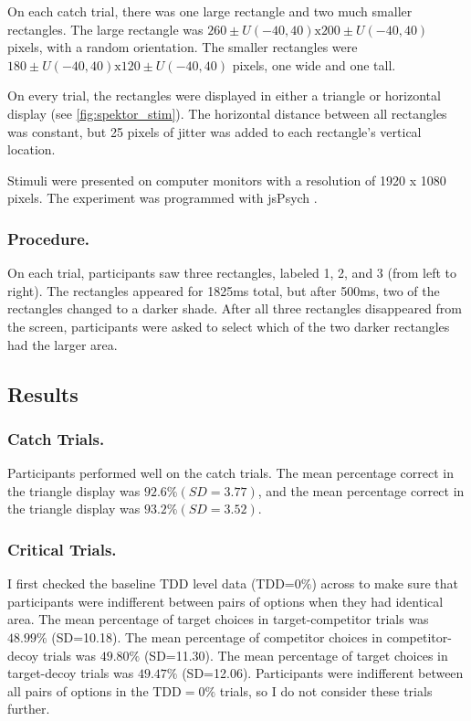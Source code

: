 {{On each catch trial, there was one large rectangle and two much smaller rectangles. The large rectangle was $260 \pm U(-40, 40) \text{x} 200 \pm U(-40, 40)$ pixels, with a random orientation. The smaller rectangles were $180 \pm U(-40, 40) \text{x} 120 \pm U(-40, 40)$ pixels, one wide and one tall.

On every trial, the rectangles were displayed in either a triangle or horizontal display (see \ref{fig:spektor_stim}). The horizontal distance between all rectangles was constant, but 25 pixels of jitter was added to each rectangle's vertical location.

Stimuli were presented on computer monitors with a resolution of 1920 x 1080 pixels. The experiment was programmed with jsPsych \parencite{deleeuwJsPsychJavaScriptLibrary2015}. 

\subsubsection{Procedure.}
On each trial, participants saw three rectangles, labeled 1, 2, and 3 (from left to right). The rectangles appeared for 1825ms total, but after 500ms, two of the rectangles changed to a darker shade. After all three rectangles disappeared from the screen, participants were asked to select which of the two darker rectangles had the larger area.

\subsection{Results}

\subsubsection{Catch Trials.}
Participants performed well on the catch trials. The mean percentage correct in the triangle display was $92.6\% (SD=3.77)$, and the mean percentage correct in the triangle display was $93.2\% (SD=3.52)$. 

\subsubsection{Critical Trials.}
I first checked the baseline TDD level data (TDD=$0\%$) across to make sure that participants were indifferent between pairs of options when they had identical area. The mean percentage of target choices in target-competitor trials was $48.99\%$ (SD=10.18). The mean percentage of competitor choices in competitor-decoy trials was $49.80\%$ (SD=11.30). The mean percentage of target choices in target-decoy trials was $49.47\%$ (SD=12.06). Participants were indifferent between all pairs of options in the $\text{TDD}=0\%$ trials, so I do not consider these trials further.

}}
